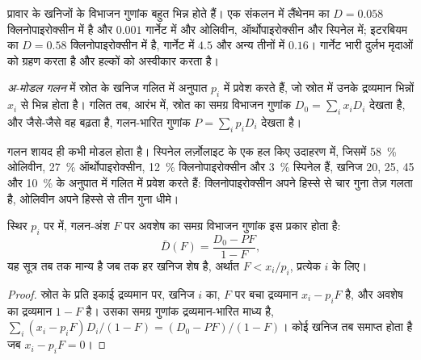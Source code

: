 प्रावार के खनिजों के विभाजन गुणांक बहुत भिन्न होते हैं। एक संकलन में
लैंथेनम का $D = 0.058$ क्लिनोपाइरोक्सीन में है और $0.001$
गार्नेट में और ओलिवीन, ऑर्थोपाइरोक्सीन और स्पिनेल में; इटरबियम का $D = 0.58$ क्लिनोपाइरोक्सीन में
है, गार्नेट में $4.5$ और अन्य तीनों में $0.16$। गार्नेट भारी दुर्लभ मृदाओं को
ग्रहण करता है और हल्कों को अस्वीकार करता है।

\begin{definition}[अ-मोडल गलन]\label{def:b3:trace-element-modelling:nonmodal}
\emph{अ-मोडल गलन} में स्रोत के खनिज गलित में अनुपात $p_i$ में प्रवेश करते हैं, जो
स्रोत में उनके द्रव्यमान भिन्नों $x_i$ से भिन्न होता है। गलित तब, आरंभ में,
स्रोत का समग्र विभाजन गुणांक $D_0 = \sum_i x_iD_i$ देखता है, और
जैसे-जैसे वह बढ़ता है, गलन-भारित गुणांक
$P = \sum_i p_iD_i$ देखता है।
\end{definition}

गलन शायद ही कभी मोडल होता है। स्पिनेल लर्ज़ोलाइट के एक हल किए उदाहरण में, जिसमें
\qty{58}{\percent} ओलिवीन, \qty{27}{\percent} ऑर्थोपाइरोक्सीन,
\qty{12}{\percent} क्लिनोपाइरोक्सीन और \qty{3}{\percent} स्पिनेल हैं, खनिज
20, 25, 45 और \qty{10}{\percent} के अनुपात में गलित में प्रवेश करते हैं:
क्लिनोपाइरोक्सीन अपने हिस्से से चार गुना तेज़ गलता है, ओलिवीन
अपने हिस्से से तीन गुना धीमे।

\begin{proposition}
\label{prop:b3:trace-element-modelling:residue}
स्थिर $p_i$ पर  में, गलन-अंश $F$ पर अवशेष का
समग्र विभाजन गुणांक इस प्रकार होता है:
\[
\bar D(F) = \frac{D_0 - PF}{1 - F},
\]
यह सूत्र तब तक मान्य है जब तक हर खनिज शेष है, अर्थात $F < x_i/p_i$, प्रत्येक $i$ के लिए।
\end{proposition}

\begin{proof}
स्रोत के प्रति इकाई द्रव्यमान पर, खनिज $i$ का, $F$ पर बचा द्रव्यमान $x_i - p_iF$ है,
और अवशेष का द्रव्यमान $1 - F$ है। उसका समग्र गुणांक द्रव्यमान-भारित
माध्य है, $\sum_i (x_i - p_iF)D_i/(1 - F) = (D_0 - PF)/(1 - F)$। कोई खनिज तब
समाप्त होता है जब $x_i - p_iF = 0$।
\end{proof}

